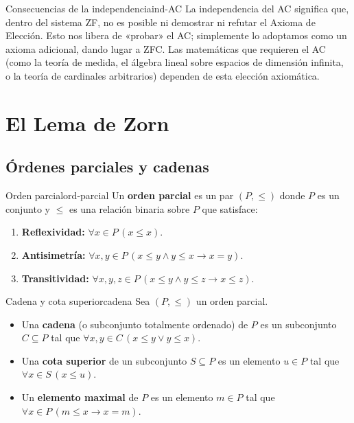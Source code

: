 \begin{observacion}{Consecuencias de la independencia}{ind-AC}
La independencia del AC significa que, dentro del sistema ZF, no es posible ni demostrar ni refutar el Axioma de Elección. Esto nos libera de «probar» el AC; simplemente lo adoptamos como un axioma adicional, dando lugar a ZFC. Las matemáticas que requieren el AC (como la teoría de medida, el álgebra lineal sobre espacios de dimensión infinita, o la teoría de cardinales arbitrarios) dependen de esta elección axiomática.
\end{observacion}

\section{El Lema de Zorn}

\subsection{Órdenes parciales y cadenas}

\begin{definicion}{Orden parcial}{ord-parcial}
Un \textbf{orden parcial} es un par $(P, \leq)$ donde $P$ es un conjunto y $\leq$ es una relación binaria sobre $P$ que satisface:
\begin{enumerate}[leftmargin=2em]
  \item \textbf{Reflexividad:} $\forall x \in P\,(x \leq x)$.
  \item \textbf{Antisimetría:} $\forall x, y \in P\,(x \leq y \wedge y \leq x \to x = y)$.
  \item \textbf{Transitividad:} $\forall x, y, z \in P\,(x \leq y \wedge y \leq z \to x \leq z)$.
\end{enumerate}
\end{definicion}

\begin{definicion}{Cadena y cota superior}{cadena}
Sea $(P, \leq)$ un orden parcial.
\begin{itemize}[leftmargin=2em]
  \item Una \textbf{cadena} (o subconjunto totalmente ordenado) de $P$ es un subconjunto $C \subseteq P$ tal que $\forall x, y \in C\,(x \leq y \vee y \leq x)$.
  \item Una \textbf{cota superior} de un subconjunto $S \subseteq P$ es un elemento $u \in P$ tal que $\forall x \in S\,(x \leq u)$.
  \item Un \textbf{elemento maximal} de $P$ es un elemento $m \in P$ tal que $\forall x \in P\,(m \leq x \to x = m)$.
\end{itemize}
\end{definicion}

